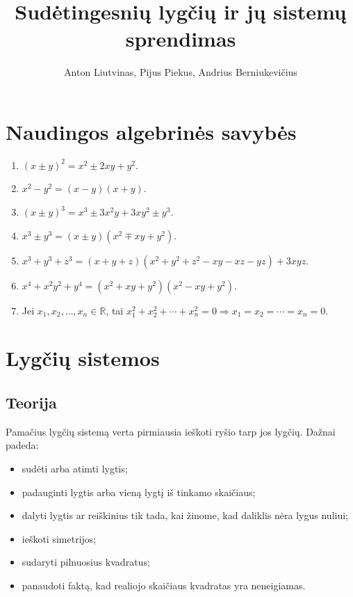 \documentclass[11pt,a4paper]{scrartcl}
\title{Sudėtingesnių lygčių ir jų sistemų sprendimas}
\author{Anton Liutvinas, Pijus Piekus, Andrius Berniukevičius}
\begin{document}
\maketitle

\section{Naudingos algebrinės savybės}

\begin{enumerate}
    \renewcommand{\labelenumi}{\textbf{\theenumi.}}

    \item $(x\pm y)^2=x^2\pm 2xy+y^2$.
    \item $x^2-y^2=(x-y)(x+y)$.
    \item $(x\pm y)^3=x^3\pm 3x^2y+3xy^2\pm y^3$.
    \item $x^3\pm y^3=(x\pm y)(x^2\mp xy+y^2)$.
    \item $x^3+y^3+z^3=(x+y+z)(x^2+y^2+z^2-xy-xz-yz)+3xyz$.
    \item $x^4+x^2y^2+y^4=(x^2+xy+y^2)(x^2-xy+y^2)$.
    \item Jei $x_1,x_2,\ldots,x_n\in\mathbb R$, tai $x_1^2+x_2^2+\cdots+x_n^2=0\Longrightarrow x_1=x_2=\cdots=x_n=0$.
\end{enumerate}


\section{Lygčių sistemos}

\subsection{Teorija}

Pamačius lygčių sistemą verta pirmiausia ieškoti ryšio tarp jos lygčių.
Dažnai padeda:

\begin{itemize}
    \item sudėti arba atimti lygtis;
    \item padauginti lygtis arba vieną lygtį iš tinkamo skaičiaus;
    \item dalyti lygtis ar reiškinius tik tada, kai žinome, kad daliklis nėra lygus nuliui;
    \item ieškoti simetrijos;
    \item sudaryti pilnuosius kvadratus;
    \item panaudoti faktą, kad realiojo skaičiaus kvadratas yra neneigiamas.
\end{itemize}
\end{document}
